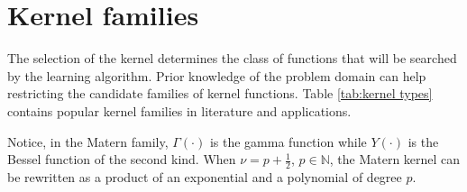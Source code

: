 \section{Kernel families}\label{kernel families}
The selection of the kernel determines the class of functions that will be searched by the learning algorithm. Prior knowledge of the problem domain can help restricting the candidate families of kernel functions.
Table \ref{tab:kernel types} contains popular kernel families in literature and applications.
\begin{table}
    \caption{Kernel types}
    \label{tab:kernel types}
\end{table}

Notice, in the Matern family, $\Gamma(\cdot)$ is the gamma function while $Y(\cdot)$ is the Bessel function of the second kind.
When $\nu=p+\frac{1}{2}$, $p \in \mathbb{N}$, the Matern kernel can be rewritten as a product of an exponential and a polynomial of degree $p$. 

